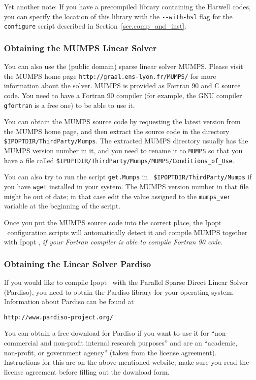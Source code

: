 \documentclass[10pt]{article}
\newcommand{\Ipopt}{{\sc Ipopt }}
\begin{document}
Yet another note: If you have a precompiled library containing the
Harwell codes, you can specify the location of this library with the
\verb|--with-hsl| flag for the {\tt configure} script described in
Section~\ref{sec.comp_and_inst}.

\subsubsection{Obtaining the MUMPS Linear Solver}\label{sec:MUMPS}

You can also use the (public domain) sparse linear solver MUMPS.
Please visit the MUMPS home page {\tt http://graal.ens-lyon.fr/MUMPS/}
for more information about the solver. MUMPS is provided as Fortran 90
and C source code.  You need to have a Fortran 90 compiler (for
example, the GNU compiler {\tt gfortran} is a free one) to be able to
use it.

You can obtain the MUMPS source code by requesting the latest version
from the MUMPS home page, and then extract the source code in the
directory {\tt \$IPOPTDIR/ThirdParty/Mumps}.  The extracted MUMPS
directory usually has the MUMPS version number in it, and you need to
rename it to {\tt MUMPS} so that you have a file called
{\tt \$IPOPTDIR/ThirdParty/Mumps/MUMPS/Conditions\_of\_Use}.

You can also try to run the script {\tt get.Mumps} in {\tt
  \$IPOPTDIR/ThirdParty/Mumps} if you have {\tt wget} installed in
your system.  The MUMPS version number in that file might be out of
date; in that case edit the value assigned to the {\tt mumps\_ver}
variable at the beginning of the script.

Once you put the MUMPS source code into the correct place, the \Ipopt\
configuration scripts will automatically detect it and compile MUMPS
together with \Ipopt, \emph{if your Fortran compiler is able to compile
Fortran 90 code}.


\subsubsection{Obtaining the Linear Solver Pardiso}\label{sec:Pardiso}

If you would like to compile \Ipopt\ with the Parallel Sparse Direct
Linear Solver (Pardiso), you need to obtain the Pardiso library for
your operating system.  Information about Pardiso can be found at

\texttt{http://www.pardiso-project.org/}

You can obtain a free download for Pardiso if you want to use it for
``non-commercial and non-profit internal research purposes'' and are
an ``academic, non-profit, or government agency'' (taken from the
license agreement).  Instructions for this are on the above mentioned
website; make sure you read the license agreement before filling out
the download form.
\end{document}

